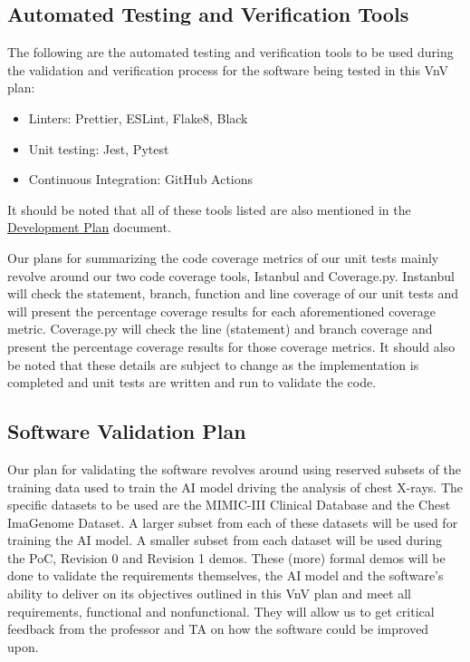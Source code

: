 \documentclass[12pt, titlepage]{article}
\begin{document}
\subsection{Automated Testing and Verification Tools}
The following are the automated testing and verification tools to be used during the validation and verification process for the software being tested in this VnV plan:
\begin{itemize}
    \item Linters: Prettier, ESLint, Flake8, Black
    \item Unit testing: Jest, Pytest
    \item Continuous Integration: GitHub Actions
\end{itemize}
It should be noted that all of these tools listed are also mentioned in the \href{https://github.com/Tusharagg1/chest-x-ray-ai/blob/main/docs/DevelopmentPlan/DevelopmentPlan.pdf}{Development Plan} document.

Our plans for summarizing the code coverage metrics of our unit tests mainly revolve around our two code coverage tools, Istanbul and Coverage.py. Instanbul will check the statement, branch, function and line coverage of our unit tests and will present the percentage coverage results for each aforementioned coverage metric. Coverage.py will check the line (statement) and branch coverage and present the percentage coverage results for those coverage metrics. It should also be noted that these details are subject to change as the implementation is completed and unit tests are written and run to validate the code.

\subsection{Software Validation Plan}
Our plan for validating the software revolves around using reserved subsets of the training data used to train the AI model driving the analysis of chest X-rays. The specific datasets to be used are the MIMIC-III Clinical Database and the Chest ImaGenome Dataset. A larger subset from each of these datasets will be used for training the AI model. A smaller subset from each dataset will be used during the PoC, Revision 0 and Revision 1 demos. These (more) formal demos will be done to validate the requirements themselves, the AI model and the software's ability to deliver on its objectives outlined in this VnV plan and meet all requirements, functional and nonfunctional. They will allow us to get critical feedback from the professor and TA on how the software could be improved upon.
\end{document}
